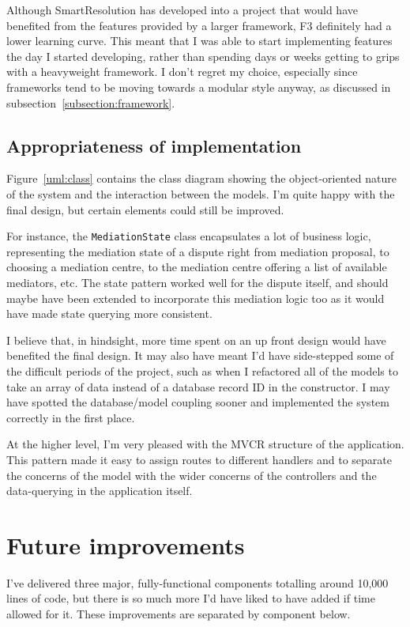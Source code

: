 Although SmartResolution has developed into a project that would have benefited from the features provided by a larger framework, F3 definitely had a lower learning curve. This meant that I was able to start implementing features the day I started developing, rather than spending days or weeks getting to grips with a heavyweight framework. I don't regret my choice, especially since frameworks tend to be moving towards a modular style anyway, as discussed in subsection~\ref{subsection:framework}.

\subsection{Appropriateness of implementation}

Figure~\ref{uml:class} contains the class diagram showing the object-oriented nature of the system and the interaction between the models. I'm quite happy with the final design, but certain elements could still be improved.

For instance, the \lstinline{MediationState} class encapsulates a lot of business logic, representing the mediation state of a dispute right from mediation proposal, to choosing a mediation centre, to the mediation centre offering a list of available mediators, etc. The state pattern worked well for the dispute itself, and should maybe have been extended to incorporate this mediation logic too as it would have made state querying more consistent.

I believe that, in hindsight, more time spent on an up front design would have benefited the final design. It may also have meant I'd have side-stepped some of the difficult periods of the project, such as when I refactored all of the models to take an array of data instead of a database record ID in the constructor. I may have spotted the database/model coupling sooner and implemented the system correctly in the first place.

At the higher level, I'm very pleased with the MVCR structure of the application. This pattern made it easy to assign routes to different handlers and to separate the concerns of the model with the wider concerns of the controllers and the data-querying in the application itself.

\section{Future improvements}

I've delivered three major, fully-functional components totalling around 10,000 lines of code, but there is so much more I'd have liked to have added if time allowed for it. These improvements are separated by component below.

